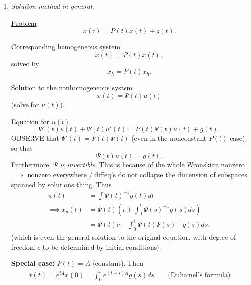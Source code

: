 \documentclass[11pt, letterpaper, oneside]{article}     %
\numberwithin{equation}{subsection}
\theoremstyle{definition}
\numberwithin{theorem}{section}
\theoremstyle{remark}
\begin{document}
\begin{enumerate}
\begin{enumerate}
  \item Recover $u(t)$ from $u'(t)$.
    \begin{align}
      u(t) = \int u'(t)dt =
      \int
      \begin{bmatrix}
        \frac{1}{4} \\ \frac{3}{4}e^{-4t}
      \end{bmatrix}
      dt
      =
      \begin{bmatrix}
        \frac{1}{4}t \\ -\frac{3}{16}e^{-4t}
      \end{bmatrix}
      + c
    \end{align}

  \item One particular solution is
    \begin{align}
      x(t) = \left(\int_0^t\frac{1}{4}ds\right)
      \begin{bmatrix}
        e^t \\ -3e^t
      \end{bmatrix}
      +
      \left(\int_0^t\frac{3}{4}e^{-4s}ds\right)
      \begin{bmatrix}
        e^{5t} \\ e^{5t}
      \end{bmatrix}.
    \end{align}

  \end{enumerate}

\item \emph{Solution method in general.}

  \underline{Problem} $$\dot x(t) = P(t)x(t) + g(t).$$

  \underline{Corresponding homogeneous system} $$\dot x(t) = P(t)x(t),$$ solved by $$\dot x_h = P(t)x_h.$$

  \underline{Solution to the nonhomogeneous system} $$x(t) = \Psi(t)u(t)$$ (solve for $u(t)$).

  \underline{Equation for $u(t)$} $$\Psi'(t)u(t) + \Psi(t)u'(t) = P(t)\Psi(t)u(t) + g(t).$$
  OBSERVE that $\Psi'(t) = P(t)\Psi(t)$ (even in the nonconstant $P(t)$ case), so that
  $$\Psi(t)u(t) = g(t).$$
  Furthermore, \emph{$\Psi$ is invertible.} This is because of the whole Wronskian nonzero $\implies$ nonzero everywhere / diffeq's do not collapse the dimension of subspaces spanned by solutions thing.
  Thus
  \begin{align}
    u(t) &= \int \Psi(t)^{-1}g(t)dt\\
    \implies x_p(t) &= \Psi(t)\left(c + \int_0^t \Psi(s)^{-1}g(s)ds\right)\\
    &= \Psi(t)c + \int_0^t\Psi(t)\Psi(s)^{-1}g(s)ds,
  \end{align}
  (which is even the general solution to the original equation, with degree of freedom $c$ to be determined by initial conditions).

  \textbf{Special case:} $P(t) = A$ (constant). Then
  \begin{align}
    x(t) = e^{tA}x(0) = \int_0^te^{(t-s)A}g(s)ds \quad\quad\text{(Duhamel's formula)}
  \end{align}

\end{enumerate}
\end{document}
